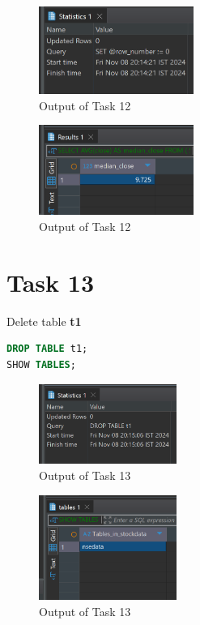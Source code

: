 \documentclass{article}
\begin{document}
\begin{figure}[H]
	\centering
	\includegraphics[width=0.45\textwidth]{Images/Task12-1.png}
	\caption{Output of Task 12}
\end{figure}

\begin{figure}[H]
	\centering
	\includegraphics[width=0.45\textwidth]{Images/Task12-2.png}
	\caption{Output of Task 12}
\end{figure}

\section*{Task 13}

\begin{task*}[13]
Delete table \textbf{t1}
\end{task*}

\begin{lstlisting}[language=SQL, caption=Deleting Table t1]
DROP TABLE t1;
SHOW TABLES;
\end{lstlisting}

\begin{figure}[H]
	\centering
	\includegraphics[width=0.4\textwidth]{Images/Task13-1.png}
	\caption{Output of Task 13}
\end{figure}

\begin{figure}[H]
	\centering
	\includegraphics[width=0.4\textwidth]{Images/Task13-2.png}
	\caption{Output of Task 13}
\end{figure}
\end{document}
